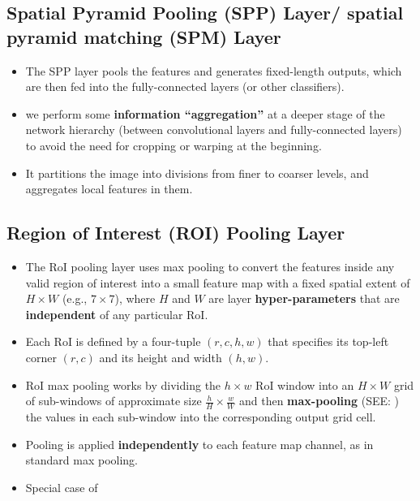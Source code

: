 \subsection{Spatial Pyramid Pooling (SPP) Layer/ spatial pyramid matching (SPM) Layer \cite{arxiv/1406.4729-sppnet}}\label{Spatial Pyramid Pooling (SPP) Layer/ spatial pyramid matching (SPM) Layer}

\begin{itemize}
    \item The SPP layer pools the features and generates fixed-length outputs, which are then fed into the fully-connected layers (or other classifiers).

    \item we perform some \textbf{information “aggregation”} at a deeper stage of the network hierarchy (between convolutional layers and fully-connected layers) to avoid the need for cropping or warping at the beginning.

    \item  It partitions the image into divisions from finer to coarser levels, and aggregates local features in them.

    
\end{itemize}



\subsection{Region of Interest (ROI) Pooling Layer \cite{arxiv/1504.08083-fast-rcnn}}\label{cnn: Region of Interest (ROI) Pooling Layer}

\begin{itemize}
    \item The RoI pooling layer uses max pooling to convert the features inside any valid region of interest into a small feature map with a fixed spatial extent of $H \times W$ (e.g., $7 \times 7$), where $H$ and $W$ are layer \textbf{hyper-parameters} that are \textbf{independent} of any particular RoI.

    \item Each RoI is defined by a four-tuple $(r, c, h, w)$ that specifies its top-left corner $(r, c)$ and its height and width $(h, w)$.

    \item RoI max pooling works by dividing the $h \times w$ RoI window into an $H \times W$ grid of sub-windows of approximate size ${\displaystyle \frac{h}{H} \times \frac{w}{W}}$ and then \textbf{max-pooling} (SEE: ) the values in each sub-window into the corresponding output grid cell.

    \item Pooling is applied \textbf{independently} to each feature map channel, as in standard max pooling. 

    \item Special case of 
\end{itemize}

